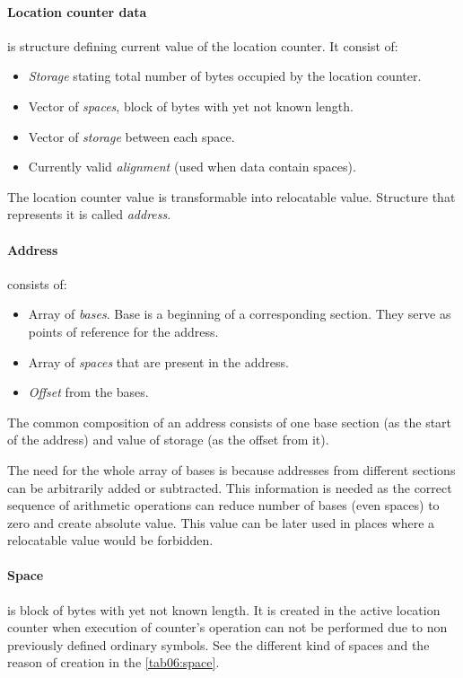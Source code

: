 \paragraph*{Location counter data} is structure defining current value of the location counter. It consist of:
\begin{itemize}
	\item \emph{Storage} stating total number of bytes occupied by the location counter.
	\item Vector of \emph{spaces}, block of bytes with yet not known length.
	\item Vector of \emph{storage} between each space.
	\item Currently valid \emph{alignment} (used when data contain spaces).
\end{itemize}

The location counter value is transformable into relocatable value. Structure that represents it is called \emph{address}.

\paragraph*{Address} consists of:
\begin{itemize}
	\item Array of \emph{bases}. Base is a beginning of a corresponding section. They serve as points of reference for the address.
	\item Array of \emph{spaces} that are present in the address. 
	\item \emph{Offset} from the bases.
\end{itemize}

The common composition of an address consists of one base section (as the start of the address) and value of storage (as the offset from it).

The need for the whole array of bases is because addresses from different sections can be arbitrarily added or subtracted. This information is needed as the correct sequence of arithmetic operations can reduce number of bases (even spaces) to zero and create absolute value. This value can be later used in places where a relocatable value would be forbidden.

\paragraph*{Space} is block of bytes with yet not known length. It is created in the active location counter when execution of counter's operation can not be performed due to non previously defined ordinary symbols. See the different kind of spaces and the reason of creation in  the \cref{tab06:space}.


